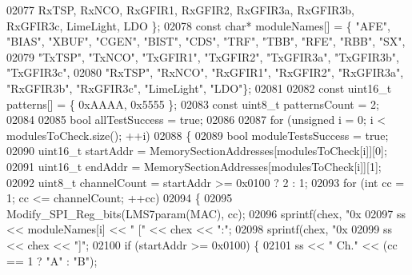 \begin{DoxyCode}
{{{{{{{{{{{{{{{{{{{{{{{{{{{{{{{{{{{{{{{{{{{{{{{{{{{{{{{02077         RxTSP, RxNCO, RxGFIR1, RxGFIR2, RxGFIR3a, RxGFIR3b, RxGFIR3c, LimeLight, 
      LDO \};
02078     \textcolor{keyword}{const} \textcolor{keywordtype}{char}* moduleNames[] = \{ \textcolor{stringliteral}{"AFE"}, \textcolor{stringliteral}{"BIAS"}, \textcolor{stringliteral}{"XBUF"}, \textcolor{stringliteral}{"CGEN"}, \textcolor{stringliteral}{"BIST"}, \textcolor{stringliteral}{"CDS"}, \textcolor{stringliteral}{"TRF"}, \textcolor{stringliteral}{"TBB"}, \textcolor{stringliteral}{"RFE"}, \textcolor{stringliteral}{"RBB"},
       \textcolor{stringliteral}{"SX"},
02079         \textcolor{stringliteral}{"TxTSP"}, \textcolor{stringliteral}{"TxNCO"}, \textcolor{stringliteral}{"TxGFIR1"}, \textcolor{stringliteral}{"TxGFIR2"}, \textcolor{stringliteral}{"TxGFIR3a"}, \textcolor{stringliteral}{"TxGFIR3b"}, \textcolor{stringliteral}{"TxGFIR3c"},
02080         \textcolor{stringliteral}{"RxTSP"}, \textcolor{stringliteral}{"RxNCO"}, \textcolor{stringliteral}{"RxGFIR1"}, \textcolor{stringliteral}{"RxGFIR2"}, \textcolor{stringliteral}{"RxGFIR3a"}, \textcolor{stringliteral}{"RxGFIR3b"}, \textcolor{stringliteral}{"RxGFIR3c"}, \textcolor{stringliteral}{"LimeLight"}, \textcolor{stringliteral}{"LDO"}\};
02081 
02082     \textcolor{keyword}{const} uint16\_t patterns[] = \{ 0xAAAA, 0x5555 \};
02083     \textcolor{keyword}{const} uint8\_t patternsCount = 2;
02084 
02085     \textcolor{keywordtype}{bool} allTestSuccess = \textcolor{keyword}{true};
02086 
02087     \textcolor{keywordflow}{for} (\textcolor{keywordtype}{unsigned} i = 0; i < modulesToCheck.size(); ++i)
02088     \{
02089         \textcolor{keywordtype}{bool} moduleTestsSuccess = \textcolor{keyword}{true};
02090         uint16\_t startAddr = MemorySectionAddresses[modulesToCheck[i]][0];
02091         uint16\_t endAddr = MemorySectionAddresses[modulesToCheck[i]][1];
02092         uint8\_t channelCount = startAddr >= 0x0100 ? 2 : 1;
02093         \textcolor{keywordflow}{for} (\textcolor{keywordtype}{int} cc = 1; cc <= channelCount; ++cc)
02094         \{
02095             Modify_SPI_Reg_bits(LMS7param(MAC), cc);
02096             sprintf(chex, \textcolor{stringliteral}{"0x%
02097             ss << moduleNames[i] << \textcolor{stringliteral}{"  ["} << chex << \textcolor{stringliteral}{":"};
02098             sprintf(chex, \textcolor{stringliteral}{"0x%
02099             ss << chex << \textcolor{stringliteral}{"]"};
02100             \textcolor{keywordflow}{if} (startAddr >= 0x0100) \{
02101                 ss << \textcolor{stringliteral}{" Ch."} << (cc == 1 ? \textcolor{stringliteral}{"A"} : \textcolor{stringliteral}{"B"});
}}}}}}}}}}}}}}}}}}}}}}}}}}}}}}}}}}}}}}}}}}}}}}}}}}}}}}}}}
\end{DoxyCode}
